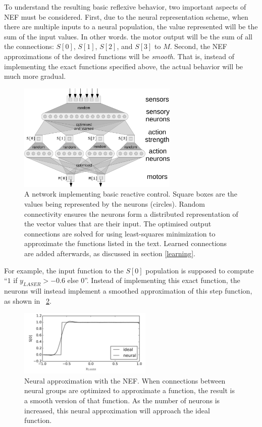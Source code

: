 \documentclass[conference]{IEEEtran}
\begin{document}
To understand the resulting basic reflexive behavior,
two important aspects of NEF must be considered. First, due to the neural 
representation scheme, when there are multiple inputs to a neural population, 
the value represented will be the sum of the input values. In other words. the 
motor output will be the sum of all the connections: $S[0]$, $S[1]$, $S[2]$, and $S[3]$ to $M$. 
Second, the NEF approximations of the desired functions will be \textit{smooth}. 
That is, instead of implementing the exact functions specified above, the 
actual behavior will be much more gradual. 

\begin{figure}[!t]
\centering
\includegraphics[width=3in]{network.png}
\caption{A network implementing basic reactive control. Square boxes are the
values being represented by the neurons (circles).  Random connectivity
ensures the neurons form a distributed representation of the vector values
that are their input.  The optimised output connections are solved for
using least-squares minimization to approximate the functions listed in
the text.  Learned connections are added afterwards, as discussed in 
section \ref{learning}.}
\label{Flow}
\end{figure}

For example, the input function to 
the $S[0]$ population is supposed to compute ``$1$ if $y_{LASER} > -0.6$ else $0$''. 
Instead of implementing this exact function, the neurons will instead implement
a smoothed approximation of this step function, as shown in
\figurename~\ref{NEF}.

\begin{figure}[!t]
\centering
\includegraphics[width=2.5in]{smoothing.png}
\caption{Neural approximation with the NEF. When connections between neural groups are optimized to approximate a function, the result is a smooth version of that function. As the number of neurons is increased, this neural approximation will approach the ideal function.}
\label{NEF}
\end{figure}
\end{document}
